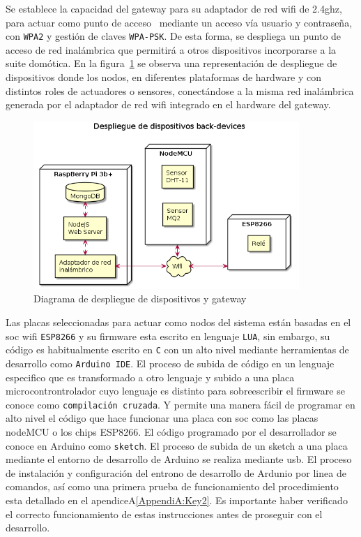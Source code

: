 \vspace{0.5cm}

Se establece la capacidad del \gls{gateway} para su adaptador de red \gls{wifi} de 2.4ghz, para actuar como punto de acceso~\cite{raspberrypiasaccesspoint} mediante un acceso vía usuario y contraseña, con \verb|WPA2| y gestión de claves \verb|WPA-PSK|. De esta forma, se despliega un punto de acceso de red inalámbrica que permitirá a otros dispositivos incorporarse a la suite domótica. En la figura~\ref{deploydevicesGateway} se observa una representación de despliegue de dispositivos donde los nodos, en diferentes plataformas de hardware y con distintos roles de actuadores o sensores, conectándose a la misma red inalámbrica generada por el adaptador de red \gls{wifi} integrado en el hardware del \gls{gateway}.

\begin{figure}[hbt!]
\label{deploydevicesGateway}
\centering
\includegraphics[height=2.5in]{figures/diagrams/physical-devices/back-devices.png}
\caption[Diagrama de despliegue de back-end]{Diagrama de despliegue de dispositivos y gateway\footnotemark}
\end{figure}

\vspace{0.5cm}

Las placas seleccionadas para actuar como nodos del sistema están basadas en el \gls{soc} \gls{wifi} \verb|ESP8266| y su firmware esta escrito en lenguaje \verb|LUA|, sin embargo, su código es habitualmente escrito en \verb|C| con un alto nivel mediante herramientas de desarrollo como \verb|Arduino IDE|. El proceso de subida de código en un lenguaje especifico que es transformado a otro lenguaje y subido a una placa microcontrontrolador cuyo lenguaje es distinto para sobreescribir el firmware se conoce como \verb|compilación cruzada|. Y permite una manera fácil de programar en alto nivel el código que hace funcionar una placa con \gls{soc} como las placas nodeMCU o los chips ESP8266. El código programado por el desarrollador se conoce en Arduino como \verb|sketch|. El proceso de subida de un \gls{sketch} a una placa mediante el entorno de desarrollo de Arduino se realiza mediante \gls{usb}. El proceso de instalación y configuración del entrono de desarrollo de Ardunio por linea de comandos, así como una primera prueba de funcionamiento del procedimiento esta detallado en el apendiceA\ref{AppendiA:Key2}. Es importante haber verificado el correcto funcionamiento de estas instrucciones antes de proseguir con el desarrollo.

